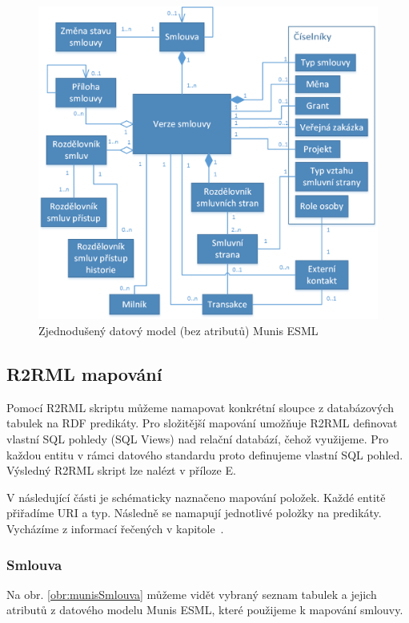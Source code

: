\begin{figure}[H]
\centerline{\includegraphics[width=\textwidth]{img/munisDatamodel.eps}}
\caption{ Zjednodušený datový model (bez atributů) Munis ESML}
\label{obr:munisDatamodel}
\end{figure}

\subsection{R2RML mapování}

Pomocí R2RML skriptu můžeme namapovat konkrétní sloupce z databázových tabulek na RDF predikáty. Pro složitější mapování umožňuje R2RML definovat vlastní SQL pohledy (SQL Views) nad relační databází, čehož využijeme. Pro každou entitu v rámci datového standardu proto definujeme vlastní SQL pohled. Výsledný R2RML skript lze nalézt v příloze E.

V následující části je schématicky naznačeno mapování položek. Každé entitě přiřadíme URI a typ. Následně se namapují jednotlivé položky na predikáty. Vycházíme z informací řečených v kapitole~.

\subsubsection{Smlouva}

Na obr. \ref{obr:munisSmlouva} můžeme vidět vybraný seznam tabulek a jejich atributů z datového modelu Munis ESML, které použijeme k mapování smlouvy.

